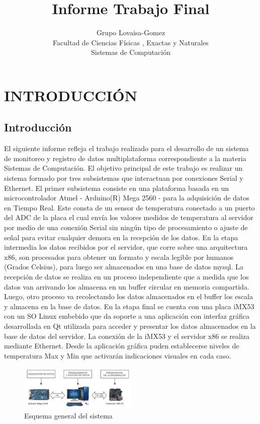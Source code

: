 \documentclass[a4paper,11pt]{book}
\title{\textcolor[gray]{.2}{Informe Trabajo Final}}
\author{Grupo Lovaisa-Gomez \\ Facultad de Ciencias Físicas , Exactas y
Naturales\\ Sistemas de Computación}
\begin{document}

\maketitle
\tableofcontents


\chapter{INTRODUCCIÓN}

\newpage
\section{Introducción}
El siguiente informe refleja el trabajo realizado para el desarrollo de un
sistema de monitoreo y registro de datos multiplataforma correspondiente a la
materia Sistemas de Computación. El objetivo principal de este trabajo es
realizar un sistema formado por tres subsistemas que interactuan por
conexiones Serial y Ethernet. El primer subsistema consiste en una plataforma
basada en un microcontrolador Atmel - Arduino(R) Mega 2560 - para la
adquisición de datos en Tiempo Real. Este consta de un sensor de temperatura
conectado a un puerto del ADC de la placa el cual envía los valores medidos de
temperatura al servidor por medio de una conexión Serial sin ningún tipo de
procesamiento o ajuste de señal para evitar cualquier demora en la recepción de
los datos. 
En la etapa intermedia los datos recibidos por el servidor, que
corre sobre una arquitectura x86, son procesados para obtener un formato y
escala legible por humanos (Grados Celsius), para luego ser almacenados en una
base de datos mysql. La recepción de datos se realiza en un proceso
independiente que a medida que los datos van arrivando los almacena en un buffer
circular en memoria compartida. Luego, otro proceso va recolectando los datos
almacenados en el buffer los escala y almacena en la base de datos.
En la etapa final se cuenta con una placa iMX53 con un SO Linux embebido que da
soporte a una aplicación con interfaz gráfica desarrollada en Qt utilizada para
acceder y presentar los datos almacenados en la base de datos del servidor. La
conexión de la iMX53 y el servidor x86 se realiza mediante Ethernet. Desde la
aplicación gráfica puden establecerse niveles de temperatura Max y Min que
activarán indicaciones visuales en cada caso.   
\begin{figure}[h!]
 \begin{center}
  \includegraphics[width=0.5\textwidth,keepaspectratio=true]{img/fig1.png}
  \caption{Esquema general del sistema}
  \label{fig:esquema}
 \end{center}
\end{figure}
\end{document}
